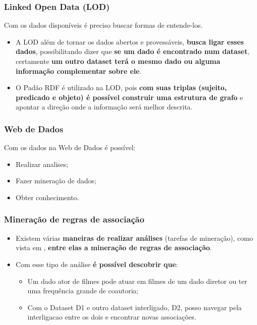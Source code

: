 \documentclass[hyperref={pdfpagelabels=false}]{beamer}
\begin{document}
\begin{frame}
	\frametitle{Linked Open Data (LOD)}
Com os dados disponíveis é preciso buscar formas de entende-los.
\begin{itemize}

	\item A LOD além de tornar os dados abertos e provessáveis, \textbf{busca ligar esses dados}, possibilitando dizer que \textbf{se um dado é encontrado num dataset}, certamente \textbf{um outro dataset terá o mesmo dado ou alguma informação complementar sobre ele}. \cite{bizer2009linked}
        \item O Padão RDF é utilizado na LOD, pois \textbf{com suas triplas (sujeito, predicado e objeto) é possível construir uma estrutura de grafo} e apontar a direção onde a informação será melhor descrita.
    
	\end{itemize}		
\end{frame}


\begin{frame}
\frametitle{Web de Dados}
Com os dados na Web de Dados é possível:
\begin{itemize}
  
   \item Realizar analises;
   \item Fazer mineração de dados; 
   \item Obter conhecimento. 
\end{itemize}
\end{frame}

\begin{frame}
	\frametitle{Mineração de regras de associação}
		\begin{itemize}
        \item  Existem várias \textbf{maneiras de realizar análises} (tarefas de mineração), como vista em \cite{Camilo2009}, \textbf{entre elas a mineração de regras de associação}.
     \item Com esse tipo de análise \textbf{é possível descobrir que}:
     \begin{itemize}
     \item Um dado ator de filmes pode atuar em filmes de um dado diretor ou ter uma frequência grande de coautoria;
     \item Com o Dataset D1 e outro dataset interligado, D2,  posso navegar pela interligacao entre os dois e encontrar novas associações.
	\end{itemize}
    \end{itemize}		
\end{frame}
\end{document}
